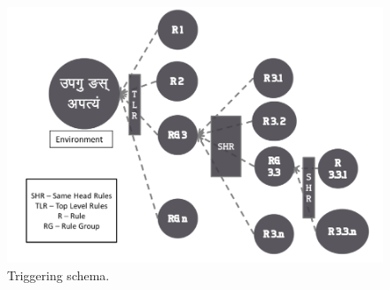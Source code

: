 \documentclass[a4paper,11pt,twoside,openright]{report}
\begin{document}
\begin{figure}[h]
    \centering
	\includegraphics[width=\textwidth]{fullImp}
    \caption{ Triggering schema.}
    \label{fig:fullImp}
\end{figure}


\\
\end{document}
